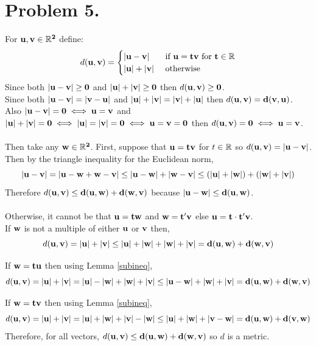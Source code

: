 \documentclass[12pt]{extarticle}
\begin{document}
\section*{Problem 5.}
For $\bf{u}, \bf{v} \in \mathbb{R}^2$ define:
\[ d(\bf{u}, \bf{v}) =  \begin{cases} |\bf{u} - \bf{v}| & \text{ if } \bf{u} = t\bf{v} \text{ for } t \in \mathbb{R} \\ |\bf{u} | + |\bf{v}| & \text{ otherwise} \end{cases}\]
Since both $|\bf{u} - \bf{v}| \ge 0$ and $|\bf{u}| + |\bf{v}| \ge 0$ then $d(\bf{u}, \bf{v}) \ge 0$. \\ 
Since both $|\bf{u} - \bf{v}|  = |\bf{v} - \bf{u}|$ and $|\bf{u}| + |\bf{v}| = |\bf{v}| + |\bf{u}|$ then $d(\bf{u}, \bf{v}) = d(\bf{v}, \bf{u})$. \\   
Also $|\bf{u} - \bf{v}| = 0 \iff \bf{u} = \bf{v}$ and $|\bf{u}| + |\bf{v}| = 0 \iff |\bf{u} | = |\bf{v}| = 0 \iff \bf{u} = \bf{v} = 0$ then $d(\bf{u}, \bf{v}) = 0 \iff \bf{u} = \bf{v}$. \\\\
Then take any $\bf{w} \in \mathbb{R}^2$. First, suppose that $\bf{u} = t \bf{v}$ for $t \in \mathbb{R}$ so $d(\bf{u}, \bf{v}) = |\bf{u} - \bf{v}|$. Then by the triangle inequality for the Euclidean norm, \[|\bf{u} - \bf{v}| =  |\bf{u} - \bf{w} + \bf{w} - \bf{v}| \le |\bf{u} - \bf{w} | + |\bf{w} - \bf{v}| \le (|\bf{u}| + |\bf{w}|) + (|\bf{w}| + |\bf{v}|)\] 
Therefore $d(\bf{u}, \bf{v}) \le d(\bf{u}, \bf{w}) + d(\bf{w}, \bf{v})$ because $|\bf{u} - \bf{w}| \le d(\bf{u}, \bf{w})$. \\\\
Otherwise, it cannot be that $\bf{u} = t \bf{w}$ and $\bf{w} = t'\bf{v}$ else $\bf{u} = t \cdot t'\bf{v}$. \\
If $\bf{w}$ is not a multiple of either $\bf{u}$ or $\bf{v}$ then,
\[d(\bf{u}, \bf{v})  = |\bf{u}| + |\bf{v}| \le |\bf{u}| + |\bf{w}| + |\bf{w}| + |\bf{v}| = d(\bf{u}, \bf{w}) + d(\bf{w}, \bf{v})\]

If $\bf{w} = t \bf{u}$ then using Lemma \ref{subineq},
\[d(\bf{u}, \bf{v})  = |\bf{u}| + |\bf{v}| = |\bf{u}| - |\bf{w}| + |\bf{w}| + |\bf{v}| \le |\bf{u} - \bf{w} | + |\bf{w}| + |\bf{v}| = d(\bf{u}, \bf{w}) + d(\bf{w}, \bf{v})\] 

If $\bf{w} = t \bf{v}$ then using Lemma \ref{subineq},
\[d(\bf{u}, \bf{v})  = |\bf{u}| + |\bf{v}| = |\bf{u}| + |\bf{w}| + |\bf{v}| - |\bf{w}| \le |\bf{u}| + | \bf{w} | + |\bf{v} - \bf{w}| = d(\bf{u}, \bf{w}) + d(\bf{v}, \bf{w})\] 
Therefore, for all vectors, $d(\bf{u}, \bf{v}) \le d(\bf{u}, \bf{w}) + d(\bf{w}, \bf{v})$ so $d$ is a metric. \\ \\
\end{document}
